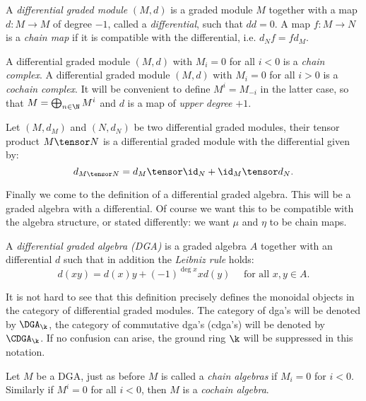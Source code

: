 \begin{definition}
	A \emph{differential graded module} $(M, d)$ is a graded module $M$ together with a map $d: M \to M$ of degree $-1$, called a \emph{differential}, such that $dd = 0$. A map $f: M \to N$ is a \emph{chain map} if it is compatible with the differential, i.e. $d_N f = f d_M$.
\end{definition}

A differential graded module $(M, d)$ with $M_i = 0$ for all $i < 0$ is a \emph{chain complex}. A differential graded module $(M, d)$ with $M_i = 0$ for all $i > 0$ is a \emph{cochain complex}. It will be convenient to define $M^i = M_{-i}$ in the latter case, so that $M = \bigoplus_{n \in \N} M^i$ and $d$ is a map of \emph{upper degree} $+1$.

\begin{definition}
	Let $(M, d_M)$ and $(N, d_N)$ be two differential graded modules, their tensor product $M \tensor N$ is a differential graded module with the differential given by:
	$$ d_{M \tensor N} = d_M \tensor \id_N + \id_M \tensor d_N. $$
\end{definition}

Finally we come to the definition of a differential graded algebra. This will be a graded algebra with a differential. Of course we want this to be compatible with the algebra structure, or stated differently: we want $\mu$ and $\eta$ to be chain maps.

\begin{definition}
	A \emph{differential graded algebra (DGA)} is a graded algebra $A$ together with an differential $d$ such that in addition the \emph{Leibniz rule} holds:
	$$ d(xy) = d(x) y + (-1)^{\deg{x}} x d(y) \quad\text{ for all } x, y \in A. $$
\end{definition}


It is not hard to see that this definition precisely defines the monoidal objects in the category of differential graded modules. The category of dga's will be denoted by $\DGA_\k$, the category of commutative dga's (cdga's) will be denoted by $\CDGA_\k$. If no confusion can arise, the ground ring $\k$ will be suppressed in this notation.

Let $M$ be a DGA, just as before $M$ is called a \emph{chain algebras} if $M_i = 0$ for $i < 0$. Similarly if $M^i = 0$ for all $i < 0$, then $M$ is a \emph{cochain algebra}.



